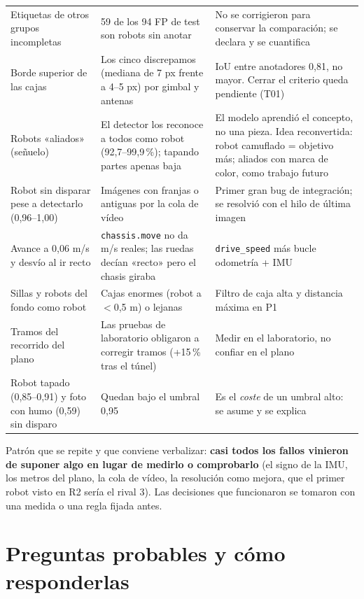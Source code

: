 \documentclass[11pt,a4paper]{article}
\newcommand{\cod}[1]{\texttt{#1}}
\begin{document}
\begin{longtable}{@{}P{3.3cm}P{5.2cm}P{6cm}@{}}
Etiquetas de otros grupos incompletas & 59 de los 94 FP de test son robots sin anotar & No se corrigieron para conservar la comparación; se declara y se cuantifica \\
Borde superior de las cajas & Los cinco discrepamos (mediana de 7 px frente a 4--5 px) por gimbal y antenas & IoU entre anotadores 0,81, no mayor. Cerrar el criterio queda pendiente (T01) \\
Robots «aliados» (señuelo) & El detector los reconoce a todos como robot (92,7--99,9\,\%); tapando partes apenas baja & El modelo aprendió el concepto, no una pieza. Idea reconvertida: robot camuflado = objetivo más; aliados con marca de color, como trabajo futuro \\
Robot sin disparar pese a detectarlo (0,96--1,00) & Imágenes con franjas o antiguas por la cola de vídeo & Primer gran bug de integración; se resolvió con el hilo de última imagen \\
Avance a 0,06 m/s y desvío al ir recto & \cod{chassis.move} no da m/s reales; las ruedas decían «recto» pero el chasis giraba & \cod{drive\_\allowbreak{}speed} más bucle odometría + IMU \\
Sillas y robots del fondo como robot & Cajas enormes (robot a $<$0,5 m) o lejanas & Filtro de caja alta y distancia máxima en P1 \\
Tramos del recorrido del plano & Las pruebas de laboratorio obligaron a corregir tramos (+15\,\% tras el túnel) & Medir en el laboratorio, no confiar en el plano \\
Robot tapado (0,85--0,91) y foto con humo (0,59) sin disparo & Quedan bajo el umbral 0,95 & Es el \emph{coste} de un umbral alto: se asume y se explica \\
\bottomrule
\end{longtable}

\begin{clave}
Patrón que se repite y que conviene verbalizar: \textbf{casi todos los fallos vinieron de suponer algo en lugar de medirlo o comprobarlo} (el signo de la IMU, los metros del plano, la cola de vídeo, la resolución como mejora, que el primer robot visto en R2 sería el rival 3). Las decisiones que funcionaron se tomaron con una medida o una regla fijada antes.
\end{clave}

\newpage
\section{Preguntas probables y cómo responderlas}\label{sec:preguntas}
\end{document}
